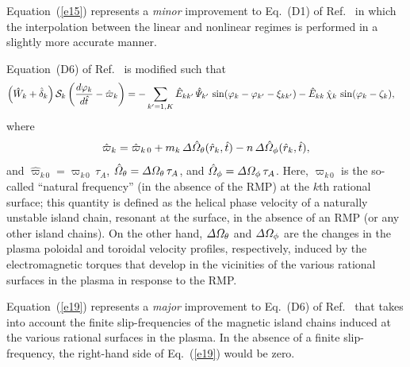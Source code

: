 \documentclass[12pt,prb,aps]{revtex4-1}
\begin{document}
Equation~(\ref{e15}) represents a {\em minor}\/ improvement to Eq.~(D1) of Ref.~ in which the interpolation between the
linear and nonlinear regimes is performed in a slightly more accurate manner. 

Equation~(D6) of Ref.~ is modified such that
\begin{align}\label{e19}
\left(\hat{W}_k +\hat{\delta}_k\right){\cal S}_k\left(\frac{d\varphi_k}{d\hat{t}}-\hat{\varpi}_k\right)&=
- \sum_{k'=1,K}\hat{E}_{kk'}\,\hat{\mit\Psi}_{k'}\,\sin(\varphi_k-\varphi_{k'}-\xi_{kk'})-\hat{E}_{kk}\,\hat{\chi}_k\,\sin(\varphi_k-\zeta_k),
\end{align}
where
\begin{equation}
\hat{\varpi}_k= \hat{\varpi}_{k\,0}+m_k\,{\mit\Delta}\hat{\mit\Omega}_\theta(\hat{r}_k,\hat{t})-n\,{\mit\Delta}\hat{\mit\Omega}_\phi(\hat{r}_k,\hat{t}),
\end{equation}
and $\hat{\varpi}_{k\,0}= \varpi_{k\,0}\,\tau_A$, $\hat{\mit\Omega}_\theta= {\mit\Delta}{\mit\Omega}_\theta\,\tau_A$, and $\hat{\mit\Omega}_\phi= {\mit\Delta}{\mit\Omega}_\phi\,\tau_A$. Here, $\varpi_{k\,0}$
is the so-called ``natural frequency''  (in the absence of the RMP) at the $k$th rational surface; this quantity is defined as the helical phase velocity of a naturally unstable island chain, resonant at the surface, in the
absence of an RMP (or any other island chains). On the other hand,  ${\mit\Delta}{\mit\Omega}_\theta$ and ${\mit\Delta}{\mit\Omega}_\phi$ are the changes in the plasma
poloidal and toroidal velocity profiles, respectively, induced by the electromagnetic torques that develop in the vicinities of the various rational surfaces in the plasma in response to the RMP.

Equation~(\ref{e19}) represents
a {\em major}\/ improvement to Eq.~(D6) of Ref.~ that takes into  account the finite slip-frequencies of the magnetic island chains induced at
the various rational surfaces in the plasma. In the absence of a finite slip-frequency, the right-hand side of Eq.~(\ref{e19}) would be zero. 
\end{document}

